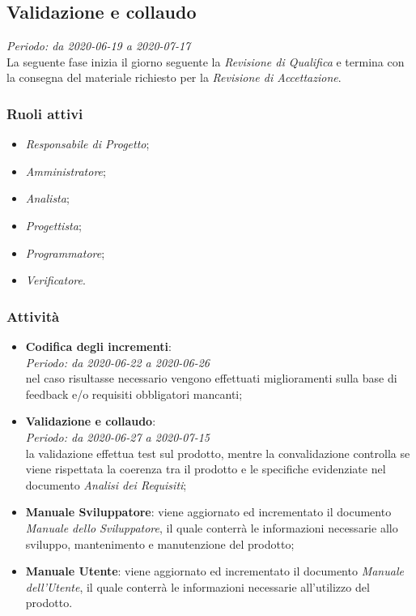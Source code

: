 \subsection{Validazione e collaudo}
\textit{Periodo: da 2020-06-19 a 2020-07-17}\\
La seguente fase inizia il giorno seguente la \textit{Revisione di Qualifica} e termina con la consegna del materiale richiesto per la \textit{Revisione di Accettazione}.

\subsubsection{Ruoli attivi} \begin{itemize}
\item \textit{Responsabile di Progetto};
\item \textit{Amministratore};
\item \textit{Analista};
\item \textit{Progettista};
\item \textit{Programmatore};
\item \textit{Verificatore}.
\end{itemize}

\subsubsection{Attività}
\begin{itemize}
\item \textbf{Codifica degli incrementi}:\\
\textit{Periodo: da 2020-06-22 a 2020-06-26} \\
nel caso risultasse necessario vengono effettuati miglioramenti sulla base di feedback e/o requisiti obbligatori mancanti;
\item \textbf{Validazione e collaudo}: \\
\textit{Periodo: da 2020-06-27 a 2020-07-15} \\
la validazione effettua test sul prodotto, mentre la convalidazione controlla se viene rispettata la coerenza tra il prodotto e le specifiche evidenziate nel documento \textit{Analisi dei Requisiti};
\item \textbf{Manuale Sviluppatore}: viene aggiornato ed incrementato il documento \textit{Manuale dello Sviluppatore}, il quale conterrà le informazioni necessarie allo sviluppo, mantenimento e manutenzione del prodotto;
\item \textbf{Manuale Utente}: viene aggiornato ed incrementato il documento \textit{Manuale dell'Utente}, il quale conterrà le informazioni necessarie all'utilizzo del prodotto.
\end{itemize}

